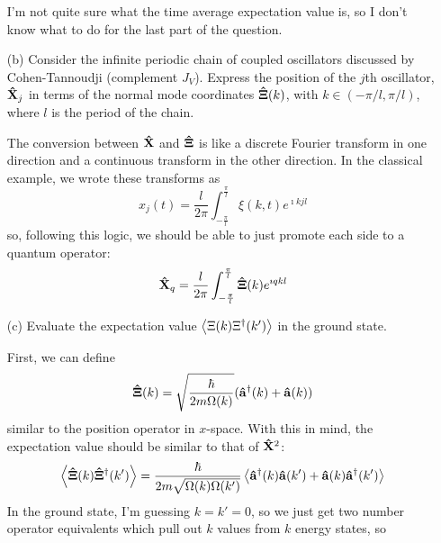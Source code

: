 \documentclass[a4paper,twoside]{article}
\begin{document}
\begin{itemize}
\begin{problem}
            I'm not quite sure what the time average expectation value is, so I don't know what to do for the last part of the question.
        \end{problem}
    \item[(b)] Consider the infinite periodic chain of coupled oscillators discussed by Cohen-Tannoudji (complement $ J_V $). Express the position of the $ j $th oscillator, $ \vu{X}_j $ in terms of the normal mode coordinates $ \vu{\Xi}(k) $, with $ k \in (- \pi / l, \pi / l) $, where $ l $ is the period of the chain.
        \begin{problem}
            The conversion between $ \vu{X} $ and $ \vu{\Xi} $ is like a discrete Fourier transform in one direction and a continuous transform in the other direction. In the classical example, we wrote these transforms as
            \begin{equation}
                x_j(t) = \frac{l}{2 \pi} \int_{- \frac{\pi}{l}}^{ \frac{\pi}{l}} \xi(k, t) e^{\imath k j l}
            \end{equation}
            so, following this logic, we should be able to just promote each side to a quantum operator:
            \begin{equation}
                \vu{X}_q = \frac{l}{2 \pi} \int_{- \frac{\pi}{l}}^{ \frac{\pi}{l}} \vu{\Xi}(k) e^{\imath q k l}
            \end{equation}
        \end{problem}
    \item[(c)] Evaluate the expectation value $ \ev{\Xi(k) \Xi^\dagger(k')} $ in the ground state.
        \begin{problem}
            First, we can define
            \begin{equation}
                \vu{\Xi}(k) = \sqrt{\frac{\hbar}{2 m \Omega(k)}} ( \vu{a}^\dagger(k) + \vu{a}(k))
            \end{equation}
            similar to the position operator in $ x $-space. With this in mind, the expectation value should be similar to that of $ \vu{X}^2 $:
            \begin{equation}
                \ev{ \vu{\Xi}(k) \vu{\Xi}^\dagger(k')} = \frac{\hbar}{2m \sqrt{\Omega(k) \Omega(k')}} \ev{ \vu{a}^\dagger(k) \vu{a}(k') + \vu{a}(k) \vu{a}^\dagger(k')}
            \end{equation}
            In the ground state, I'm guessing $ k = k' = 0 $, so we just get two number operator equivalents which pull out $ k $ values from $ k $ energy states, so
            \begin{equation}

\end{equation}
\end{problem}
\end{itemize}
\end{document}

